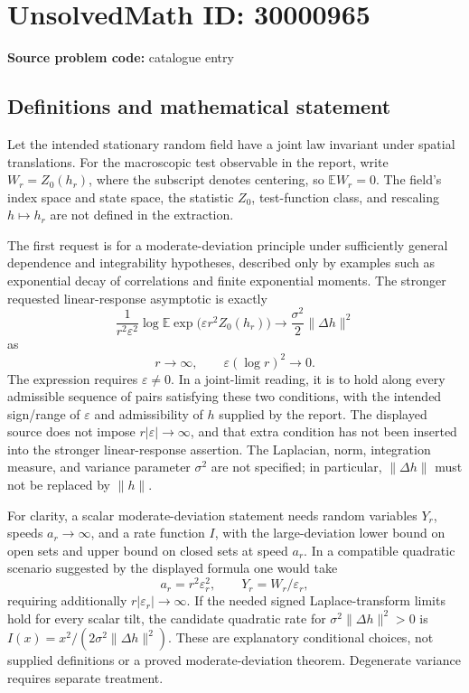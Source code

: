 \documentclass[11pt]{article}
\newcommand{\E}{\mathbb{E}}
\begin{document}
\section*{UnsolvedMath ID: 30000965}
\textbf{Source problem code:} catalogue entry
\subsection{Definitions and mathematical statement}
Let the intended stationary random field have a joint law invariant under spatial translations. For the macroscopic test observable in the report, write \(W_r=Z_0(h_r)\), where the subscript denotes centering, so \(\E W_r=0\). The field's index space and state space, the statistic \(Z_0\), test-function class, and rescaling \(h\mapsto h_r\) are not defined in the extraction.

The first request is for a moderate-deviation principle under sufficiently general dependence and integrability hypotheses, described only by examples such as exponential decay of correlations and finite exponential moments. The stronger requested linear-response asymptotic is exactly
\[
 \frac{1}{r^2\varepsilon^2}\log\E
       \exp\bigl(\varepsilon r^2 Z_0(h_r)\bigr)
 \longrightarrow\frac{\sigma^2}{2}\|\Delta h\|^2
\]
as
\[
 r\to\infty,\qquad \varepsilon(\log r)^2\to0.
\]
The expression requires \(\varepsilon\ne0\). In a joint-limit reading, it is to hold along every admissible sequence of pairs satisfying these two conditions, with the intended sign/range of \(\varepsilon\) and admissibility of \(h\) supplied by the report. The displayed source does not impose \(r|\varepsilon|\to\infty\), and that extra condition has not been inserted into the stronger linear-response assertion. The Laplacian, norm, integration measure, and variance parameter \(\sigma^2\) are not specified; in particular, \(\|\Delta h\|\) must not be replaced by \(\|h\|\).

For clarity, a scalar moderate-deviation statement needs random variables \(Y_r\), speeds \(a_r\to\infty\), and a rate function \(I\), with the large-deviation lower bound on open sets and upper bound on closed sets at speed \(a_r\). In a compatible quadratic scenario suggested by the displayed formula one would take
\[
 a_r=r^2\varepsilon_r^2,\qquad Y_r=W_r/\varepsilon_r,
\]
requiring additionally \(r|\varepsilon_r|\to\infty\). If the needed signed Laplace-transform limits hold for every scalar tilt, the candidate quadratic rate for \(\sigma^2\|\Delta h\|^2>0\) is \(I(x)=x^2/(2\sigma^2\|\Delta h\|^2)\). These are explanatory conditional choices, not supplied definitions or a proved moderate-deviation theorem. Degenerate variance requires separate treatment.
\end{document}
